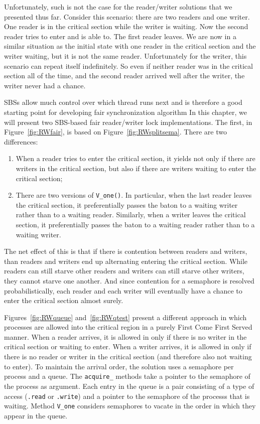 \documentclass{report}
\begin{document}
Unfortunately, such is not the case for the
reader/writer solutions that we presented thus far.
Consider this scenario: there are two readers and one writer.  One reader
is in the critical section while the writer is waiting.  Now the
second reader tries to enter and is able to.  The first reader leaves.
We are now in a similar situation as the initial state with one reader
in the critical section and the writer waiting, but it is not the same
reader.  Unfortunately for the writer, this scenario can repeat itself
indefinitely.  So even if neither reader was in the critical section
all of the time, and the second reader arrived well after the writer,
the writer never had a chance.

SBSs allow much control over which thread runs next and is therefore a
good starting point for developing fair synchronization algorithm
In this chapter, we will present two SBS-based fair reader/writer lock
implementations.
The first, in Figure~\ref{fig:RWfair}, is based on Figure~\ref{fig:RWsplitsema}.
There are two differences:

\begin{enumerate}
\item When a reader tries to enter the critical section, it yields not only
if there are writers in the critical section, but also if there are writers
waiting to enter the critical section;
\item There are two versions of \texttt{V\_one()}.  In particular, when the
last reader leaves the critical section, it preferentially passes the baton
to a waiting writer rather than to a waiting reader.  Similarly,
when a writer leaves the critical section, it preferentially passes
the baton to a waiting reader rather than to a waiting writer.
\end{enumerate}

The net effect of this is that if there is contention between readers and
writers, than readers and writers end up alternating entering the critical
section.  While readers can still starve other readers and writers can still
starve other writers, they cannot starve one another.  And since contention for
a semaphore is resolved probabilistically, each reader and each writer will
eventually have a chance to enter the critical section almost surely.

Figures~\ref{fig:RWqueue} and~\ref{fig:RWqtest} present a different approach
in which processes are allowed into the critical region in a purely First
Come First Served manner.  When a reader arrives, it is allowed in only if
there is no writer in the critical section or waiting to enter.  When a writer
arrives, it is allowed in only if there is no reader or writer in the
critical section (and therefore also not waiting to enter).  To maintain the
arrival order, the solution uses a semaphore per process and a queue.
The \texttt{acquire\_} methods take a pointer to
the semaphore of the process as argument.
Each entry in the queue is a pair consisting of a type of access
(\texttt{.read} or \texttt{.write}) and a pointer to the semaphore of the
processs that is waiting.  Method \texttt{V\_one} considers semaphores to vacate
in the order in which they appear in the queue.
\end{document}
